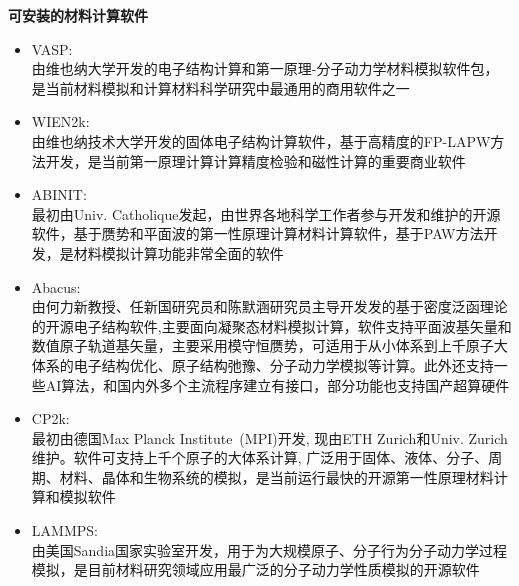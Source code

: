 \textbf{可安装的材料计算软件}
\begin{itemize}
	\item \textrm{VASP}:\\
		由维也纳大学开发的电子结构计算和第一原理-分子动力学材料模拟软件包，是当前材料模拟和计算材料科学研究中最通用的商用软件之一
	\item \textrm{WIEN2k}:\\
		由维也纳技术大学开发的固体电子结构计算软件，基于高精度的\textrm{FP}-\textrm{LAPW}方法开发，是当前第一原理计算计算精度检验和磁性计算的重要商业软件
	\item \textrm{ABINIT}:\\
		最初由\textrm{Univ. Catholique}发起，由世界各地科学工作者参与开发和维护的开源软件，基于赝势和平面波的第一性原理计算材料计算软件，基于\textrm{PAW}方法开发，是材料模拟计算功能非常全面的软件
	\item \textrm{Abacus}:\\
		由何力新教授、任新国研究员和陈默涵研究员主导开发发的基于密度泛函理论的开源电子结构软件,主要面向凝聚态材料模拟计算，软件支持平面波基矢量和数值原子轨道基矢量，主要采用模守恒赝势，可适用于从小体系到上千原子大体系的电子结构优化、原子结构弛豫、分子动力学模拟等计算。此外还支持一些\textrm{AI}算法，和国内外多个主流程序建立有接口，部分功能也支持国产超算硬件 
	\item \textrm{CP2k}:\\
		最初由德国\textrm{Max Planck Institute~(MPI)}开发, 现由\textrm{ETH Zurich}和\textrm{Univ. Zurich}维护。软件可支持上千个原子的大体系计算, 广泛用于固体、液体、分子、周期、材料、晶体和生物系统的模拟，是当前运行最快的开源第一性原理材料计算和模拟软件
	\item \textrm{LAMMPS}:\\
		由美国\textrm{Sandia}国家实验室开发，用于为大规模原子、分子行为分子动力学过程模拟，是目前材料研究领域应用最广泛的分子动力学性质模拟的开源软件
\end{itemize}

